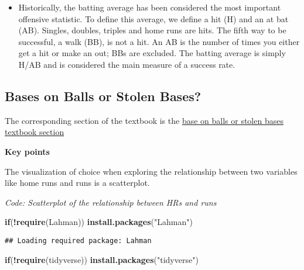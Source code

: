 \documentclass[
]{article}
\newenvironment{Shaded}{\begin{snugshade}}{\end{snugshade}}
\newcommand{\ControlFlowTok}[1]{\textcolor[rgb]{0.13,0.29,0.53}{\textbf{#1}}}
\newcommand{\KeywordTok}[1]{\textcolor[rgb]{0.13,0.29,0.53}{\textbf{#1}}}
\newcommand{\NormalTok}[1]{#1}
\newcommand{\OperatorTok}[1]{\textcolor[rgb]{0.81,0.36,0.00}{\textbf{#1}}}
\newcommand{\StringTok}[1]{\textcolor[rgb]{0.31,0.60,0.02}{#1}}
\providecommand{\tightlist}{%
  \setlength{\itemsep}{0pt}\setlength{\parskip}{0pt}}
\begin{document}
\begin{itemize}
\tightlist
\item
  Historically, the batting average has been considered the most
  important offensive statistic. To define this average, we define a hit
  (H) and an at bat (AB). Singles, doubles, triples and home runs are
  hits. The fifth way to be successful, a walk (BB), is not a hit. An AB
  is the number of times you either get a hit or make an out; BBs are
  excluded. The batting average is simply H/AB and is considered the
  main measure of a success rate.
\end{itemize}

\hypertarget{bases-on-balls-or-stolen-bases}{%
\subsection{Bases on Balls or Stolen
Bases?}\label{bases-on-balls-or-stolen-bases}}

The corresponding section of the textbook is the
\href{https://rafalab.github.io/dsbook/linear-models.html\#base-on-balls-or-stolen-bases}{base
on balls or stolen bases textbook section}

\textbf{Key points}

The visualization of choice when exploring the relationship between two
variables like home runs and runs is a scatterplot.

\emph{Code: Scatterplot of the relationship between HRs and runs}

\begin{Shaded}
\begin{Highlighting}[]
\ControlFlowTok{if}\NormalTok{(}\OperatorTok{!}\KeywordTok{require}\NormalTok{(Lahman)) }\KeywordTok{install.packages}\NormalTok{(}\StringTok{"Lahman"}\NormalTok{)}
\end{Highlighting}
\end{Shaded}

\begin{verbatim}
## Loading required package: Lahman
\end{verbatim}

\begin{Shaded}
\begin{Highlighting}[]
\ControlFlowTok{if}\NormalTok{(}\OperatorTok{!}\KeywordTok{require}\NormalTok{(tidyverse)) }\KeywordTok{install.packages}\NormalTok{(}\StringTok{"tidyverse"}\NormalTok{)}
\end{Highlighting}
\end{Shaded}
\end{document}
